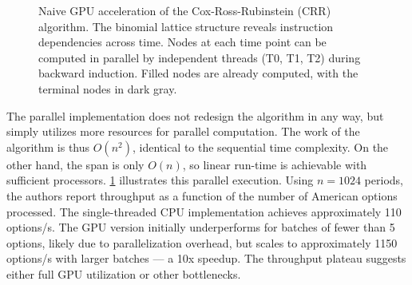\documentclass[english,12pt,a4paper,pdftex,sci,utf8]{aaltothesis}
\begin{document}
\begin{figure}[htbp]
    \centering
    \caption{Naive GPU acceleration of the Cox-Ross-Rubinstein (CRR) algorithm. The binomial lattice structure reveals instruction dependencies across time. Nodes at each time point can be computed in parallel by independent threads (T0, T1, T2) during backward induction. Filled nodes are already computed, with the terminal nodes in dark gray.}
    \label{fig:crr-gpu-naive}
\end{figure}

The parallel implementation does not redesign the algorithm in any way, but simply utilizes more resources for parallel computation. The work of the algorithm is thus $O(n^2)$, identical to the sequential time complexity. On the other hand, the span is only $O(n)$, so linear run-time is achievable with sufficient processors. \cref{fig:crr-gpu-naive} illustrates this parallel execution. Using $n=1024$ periods, the authors report throughput as a function of the number of American options processed. The single-threaded CPU implementation achieves approximately 110 options/s. The GPU version initially underperforms for batches of fewer than 5 options, likely due to parallelization overhead, but scales to approximately 1150 options/s with larger batches --- a 10x speedup. The throughput plateau suggests either full GPU utilization or other bottlenecks.
\end{document}
